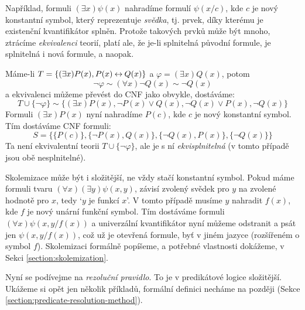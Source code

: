 Například, formuli $(\exists x)\psi(x)$ nahradíme formulí $\psi(x/c)$, kde $c$ je nový konstantní symbol, který reprezentuje \emph{svědka}, tj. prvek, díky kterému je existenční kvantifikátor splněn. Protože takových prvků může být mnoho, ztrácíme \emph{ekvivalenci} teorií, platí ale, že je-li splnitelná původní formule, je splnitelná i nová formule, a naopak.

\begin{example}
  Máme-li $T=\{(\exists x)P(x),P(x)\mathbin{\leftrightarrow} Q(x)\}$ a $\varphi=(\exists x)Q(x)$, potom 
  $$
  \neg\varphi\sim(\forall x)\neg Q(x)\sim\neg Q(x)
  $$
  a ekvivalenci můžeme převést do CNF jako obvykle, dostáváme:
  $$
  T\cup\{\neg \varphi\}\sim\{(\exists x)P(x),\neg P(x)\lor Q(x),\neg Q(x)\lor P(x),\neg Q(x)\}
  $$
  Formuli $(\exists x)P(x)$ nyní nahradíme $P(c)$, kde $c$ je nový konstantní symbol. Tím dostáváme CNF formuli:
  $$
  S = \{\{P(c)\},\{\neg P(x),Q(x)\},\{\neg Q(x),P(x)\},\{\neg Q(x)\}\}
  $$
  Ta není ekvivalentní teorii $T\cup\{\neg \varphi\}$, ale je s ní \emph{ekvisplnitelná} (v tomto případě jsou obě nesplnitelné).
\end{example}

Skolemizace může být i složitější, ne vždy stačí konstantní symbol. Pokud máme formuli tvaru $(\forall x)(\exists y)\psi(x,y)$, závisí zvolený svědek pro $y$ na zvolené hodnotě pro $x$, tedy `$y$ je funkcí $x$'. V tomto případě musíme $y$ nahradit $f(x)$, kde $f$ je nový unární funkční symbol. Tím dostáváme formuli $(\forall x)\psi(x,y/f(x))$ a univerzální kvantifikátor nyní můžeme odstranit a psát jen $\psi(x,y/f(x))$, což už je otevřená formule, byť v jiném jazyce (rozšířeném o symbol $f$). Skolemizaci formálně popíšeme, a potřebné vlastnosti dokážeme, v Sekci \ref{section:skolemization}. 

Nyní se podívejme na \emph{rezoluční pravidlo}. To je v predikátové logice složitější. Ukážeme si opět jen několik příkladů, formální definici necháme na později (Sekce \ref{section:predicate-resolution-method}).

